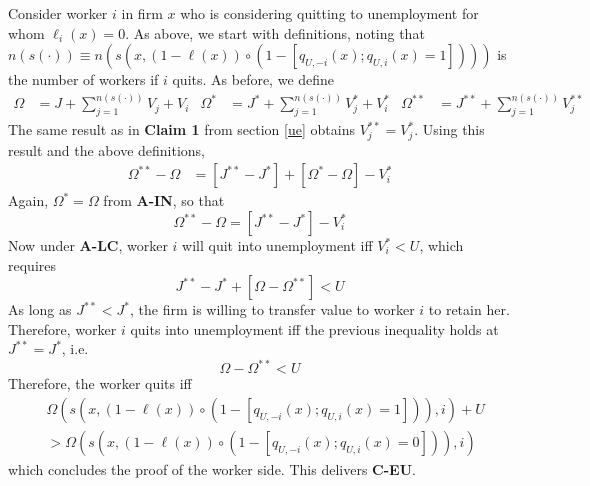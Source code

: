 Consider worker $i$ in firm $x$ who is considering quitting to unemployment
for whom $\ell _{i}\left( x\right) =0$. As above, we start with definitions,
noting that $n(s(\cdot)) \equiv n\left( s\left( x,\left( 1-\ell \left( x\right) \right) \circ
\left( 1-\left[ q_{U,-i}\left( x\right) ;q_{U,i}\left( x\right) =1\right]
\right) \right) \right) $ is the number of workers if $i$ quits. As before, we define
\begin{align*}
\Omega & =J+\sum_{j=1}^{n\left( s\left( \cdot \right) \right) }V_{j}+V_{i} &
\Omega ^{\ast }& =J^{\ast }+\sum_{j=1}^{n\left( s\left( \cdot \right)
\right) }V_{j}^{\ast }+V_{i}^{\ast } &
\Omega ^{\ast \ast }& =J^{\ast \ast }+\sum_{j=1}^{n\left( s\left( \cdot
\right) \right) }V_{j}^{\ast \ast }
\end{align*}
The same result as in \textbf{Claim 1} from section \ref{ue} obtains $%
V_{j}^{\ast \ast }=V_{j}^{\ast }$. Using this result and the above definitions,
\begin{align*}
\Omega ^{\ast \ast }-\Omega &=\left[ J^{\ast \ast }-J^{\ast }\right] +\left[ \Omega ^{\ast }-\Omega %
\right] -V_{i}^{\ast }
\end{align*}
Again, $ \Omega ^{\ast }=\Omega $ from \textbf{A-IN}, so that
\begin{equation*}
\Omega ^{\ast \ast }-\Omega =\left[ J^{\ast \ast }-J^{\ast }\right]
-V_{i}^{\ast }
\end{equation*}
Now under \textbf{A-LC}, worker $i$ will quit into unemployment iff $%
V_{i}^{\ast }<U$, which requires
\begin{equation*}
J^{\ast \ast }-J^{\ast }+[\Omega -\Omega ^{\ast \ast }]<U
\end{equation*}%
As long as $J^{\ast \ast }<J^{\ast }$, the firm is willing to transfer value
to worker $i$ to retain her. Therefore, worker $i$ quits into unemployment
iff the previous inequality holds at $J^{\ast \ast }=J^{\ast }$, i.e.
\begin{equation*}
\Omega -\Omega ^{\ast \ast }<U
\end{equation*}
Therefore, the worker quits iff
\begin{align*}
& \Omega \left( s\left( x,\left( 1-\ell \left( x\right) \right) \circ \left(
1- \left[ q_{U,-i}\left( x\right) ;q_{U,i}\left( x\right) =1\right] \right)
\right) ,i\right) +U \\
& > \Omega \left( s\left( x,\left( 1-\ell \left( x\right) \right) \circ
\left( 1-\left[ q_{U,-i}\left( x\right) ;q_{U,i}\left( x\right) =0\right]
\right) \right) ,i\right)
\end{align*}%
which concludes the proof of the worker side. This delivers \textbf{C-EU}.


